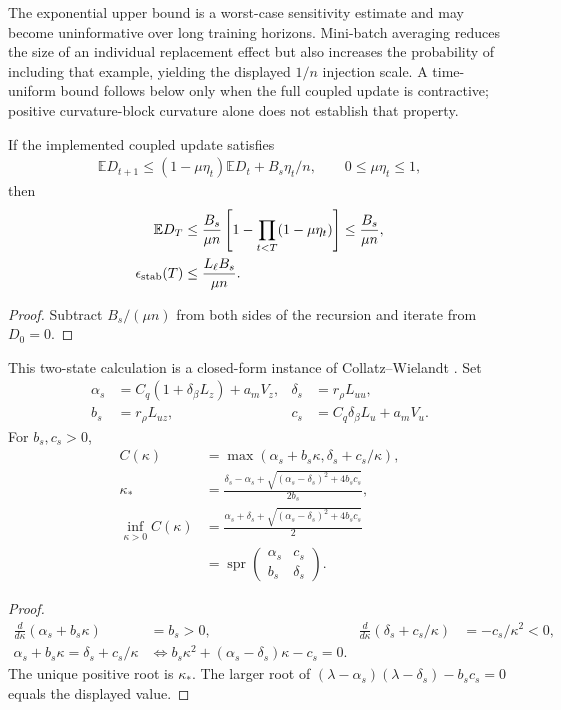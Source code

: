 The exponential upper bound is a worst-case sensitivity estimate and may become uninformative over long training horizons. Mini-batch averaging reduces the size of an individual replacement effect but also increases the probability of including that example, yielding the displayed $1/n$ injection scale. A time-uniform bound follows below only when the full coupled update is contractive; positive curvature-block curvature alone does not establish that property.

\begin{proposition}
If the implemented coupled update satisfies
\begin{align}
 \mathbb ED_{t+1}\le(1-\mu\eta_t)\mathbb ED_t+B_s\eta_t/n,
 \qquad0\le\mu\eta_t\le1,
\end{align}
then
\begin{align}
 \mathbb ED_T&\le\frac{B_s}{\mu n}
 \left[1-\prod_{t<T}(1-\mu\eta_t)\right]\le\frac{B_s}{\mu n},\\
 \epsilon_{\rm stab}(T)&\le\frac{L_\ell B_s}{\mu n}.
\end{align}
\end{proposition}
\begin{proof}
Subtract $B_s/(\mu n)$ from both sides of the recursion and iterate from $D_0=0$.
\end{proof}

\begin{proposition}
This two-state calculation is a closed-form instance of Collatz--Wielandt \citep{horn2013matrix}.
Set
\begin{align}
 \alpha_s&=C_q(1+\delta_\beta L_z)+a_mV_z,&
 \delta_s&=r_\rho L_{uu},\\
 b_s&=r_\rho L_{uz},&c_s&=C_q\delta_\beta L_u+a_mV_u.
\end{align}
For $b_s,c_s>0$,
\begin{align}
 C(\kappa)&=\max(\alpha_s+b_s\kappa,\delta_s+c_s/\kappa),\\
 \kappa_*&=\frac{\delta_s-\alpha_s+
 \sqrt{(\alpha_s-\delta_s)^2+4b_sc_s}}{2b_s},\\
 \inf_{\kappa>0}C(\kappa)
 &=\frac{\alpha_s+\delta_s+
 \sqrt{(\alpha_s-\delta_s)^2+4b_sc_s}}2\\
 &=\operatorname{spr}\begin{pmatrix}\alpha_s&c_s\\b_s&\delta_s\end{pmatrix}.
\end{align}
\end{proposition}
\begin{proof}
\begin{align}
 \frac d{d\kappa}(\alpha_s+b_s\kappa)&=b_s>0,&
 \frac d{d\kappa}(\delta_s+c_s/\kappa)&=-c_s/\kappa^2<0,\\
 \alpha_s+b_s\kappa=\delta_s+c_s/\kappa
 &\Longleftrightarrow b_s\kappa^2+(\alpha_s-\delta_s)\kappa-c_s=0.
\end{align}
The unique positive root is $\kappa_*$. The larger root of
$(\lambda-\alpha_s)(\lambda-\delta_s)-b_sc_s=0$ equals the displayed value.
\end{proof}
